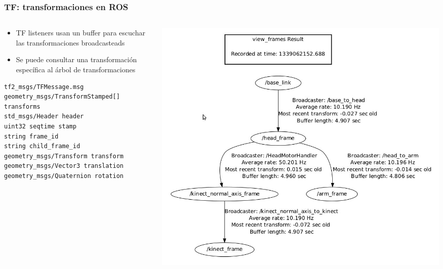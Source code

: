 \begin{frame}[fragile]
    \frametitle{TF: transformaciones en ROS}
    \footnotesize
        \begin{columns}
    	\begin{column}{0.5\textwidth}
		    \begin{itemize}
				\item TF listeners usan un buffer para escuchar las transformaciones broadcasteads
				\item Se puede consultar una transformación específica al árbol de transformaciones
			\end{itemize}
\begin{lstlisting}[style=bash] 
tf2_msgs/TFMessage.msg
geometry_msgs/TransformStamped[] transforms
std_msgs/Header header
uint32 seqtime stamp
string frame_id
string child_frame_id
geometry_msgs/Transform transform
geometry_msgs/Vector3 translation
geometry_msgs/Quaternion rotation
\end{lstlisting}
    	\end{column}
    	\begin{column}{0.5\textwidth}
    		\includegraphics[width=\columnwidth]{images/tf2_tree_graph.png}
    	\end{column}
    \end{columns}
\end{frame}

